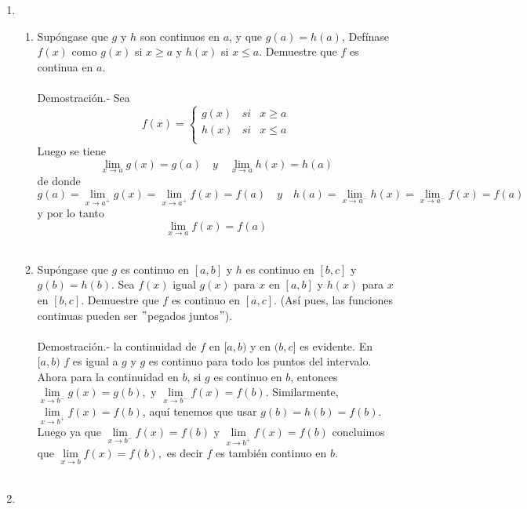 \begin{enumerate}[\bfseries 1.]
\item
\begin{enumerate}[\bfseries (a)]

    \item Supóngase que $g$ y $h$ son continuos en $a$, y que $g(a)=h(a)$, Defínase $f(x)$  como $g(x)$ si $x\geq a$ y $h(x)$ si $x\leq a$. Demuestre que $f$ es continua en $a$.\\\\
	Demostración.-\; Sea 
	$$f(x) = \left\{\begin{array}{rcl}
	    g(x)&si&x\geq a\\
	    h(x)&si&x\leq a\\
	\end{array}\right.$$
	Luego se tiene $$\lim\limits_{x\to a} g(x) = g(a)\quad  y \quad \lim\limits_{x\to a} h(x) = h(a)$$ de donde $$g(a) = \lim\limits_{x\to a^+} g(x) = \lim\limits_{x\to a^+} f(x) = f(a) \quad y \quad h(a) = \lim\limits_{x\to a^-} h(x) = \lim\limits_{x\to a^-} f(x) = f(a)$$
	y por lo tanto $$\lim\limits_{x\to a} f(x) = f(a)$$\\

    \item Supóngase que $g$ es continuo en $[a,b]$ y $h$ es continuo en $[b,c]$ y $g(b)=h(b)$. Sea $f(x)$ igual $g(x)$ para $x$ en $[a,b]$ y $h(x)$ para $x$ en $[b,c]$. Demuestre que $f$ es continuo en $[a,c]$. (Así pues, las funciones continuas pueden ser $"$pegados juntos$"$).\\\\
	Demostración.-\; la continuidad de $f$ en $[a,b)$ y en $(b,c]$ es evidente. En $[a,b)$ $f$ es igual a $g$ y $g$ es continuo para todo los puntos del intervalo.\\
	Ahora para la continuidad en $b$, si $g$ es continuo en $b$, entonces $\lim\limits_{x\to b^-} g(x) = g(b),$ y $\lim\limits_{x\to b^-} f(x) = f(b)$. Similarmente, $\lim\limits_{x\to b^+} f(x) = f(b)$, aquí tenemos que usar $g(b)=h(b)=f(b)$. Luego ya que $\lim\limits_{x\to b^-} f(x) = f(b)$ y $\lim\limits_{x\to b^+} f(x) = f(b)$ concluimos que $\lim\limits_{x\to b} f(x)=f(b),$ es decir $f$ es también continuo en $b$.\\\\

\end{enumerate}

\item 
\begin{enumerate}[\bfseries (a)]


\end{enumerate}
\end{enumerate}
